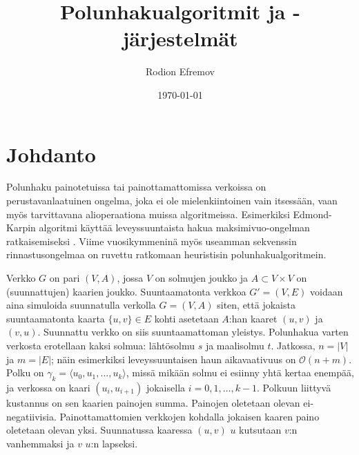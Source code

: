 \documentclass[finnish]{tktltiki2}
\title{Polunhakualgoritmit ja -järjestelmät}
\author{Rodion Efremov}
\date{\today}
\theoremstyle{definition}
\theoremstyle{remark}
\begin{document}

\frontmatter      %

\maketitle        %
\makeabstract     %

\tableofcontents  %


\mainmatter       %

\section{Johdanto}
Polunhaku painotetuissa tai painottamattomissa verkoissa on perustavanlaatuinen ongelma, joka ei ole mielenkiintoinen vain itsessään, vaan myös tarvittavana alioperaationa muissa algoritmeissa. Esimerkiksi Edmond-Karpin algoritmi käyttää leveyssuuntaista hakua maksimivuo-ongelman ratkaisemiseksi \cite{Cormen09}. Viime vuosikymmeninä myös useamman sekvenssin rinnastusongelmaa on ruvettu ratkomaan heuristisin polunhakualgoritmein.

Verkko $G$ on pari $(V, A)$, jossa $V$ on solmujen joukko ja $A \subset V \times V$ on (suunnattujen) kaarien joukko. Suuntaamatonta verkkoa $G' = (V, E)$ voidaan aina simuloida suunnatulla verkolla $G= (V, A)$ siten, että jokaista suuntaamatonta kaarta $\{ u, v \} \in E$ kohti asetetaan $A$:han kaaret $(u, v)$ ja $(v, u)$. Suunnattu verkko on siis suuntaamattoman yleistys. Polunhakua varten verkosta erotellaan kaksi solmua: lähtösolmu $s$ ja maalisolmu $t$. Jatkossa, $n = |V|$ ja $m = |E|$; näin esimerkiksi leveyssuuntaisen haun aikavaativuus on $\mathcal{O}(n + m)$. Polku on $\gamma_k = \langle u_0, u_1, \dots, u_k \rangle$, missä mikään solmu ei esiinny yhtä kertaa enempää, ja verkossa on kaari $(u_i, u_{i + 1})$ jokaisella $i = 0, 1, \dots, k - 1$. Polkuun liittyvä kustannus on sen kaarien painojen summa. Painojen oletetaan olevan ei-negatiivisia. Painottamattomien verkkojen kohdalla jokaisen kaaren paino oletetaan olevan yksi.  Suunnatussa kaaressa $(u, v)$ $u$ kutsutaan $v$:n vanhemmaksi ja $v$ $u$:n lapseksi.
\end{document}
